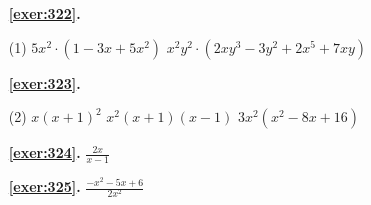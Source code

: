 \begin{enumerate}

 \item[\fontfamily{phv}\selectfont\color{blue}\textbf{\ref{exer:322}. }] \label{ans:322}
 \begin{tasks}[column-sep=1em, item-indent=1.3333em](1)
	 \task $5x^2 \cdot (1-3x+5x^2)$
	 \task* $x^2 y^2 \cdot (2 xy^3 - 3y^2 + 2 x^5 + 7xy)$
\end{tasks}



 \item[\fontfamily{phv}\selectfont\color{blue}\textbf{\ref{exer:323}. }] \label{ans:323}
 \begin{tasks}[column-sep=1em, item-indent=1.3333em](2)
	 \task $x (x+1)^2$
	 \task $x^2 (x+1)(x-1)$
	 \task $3x^2 (x^2-8x+16)$
\end{tasks}
\item[\fontfamily{phv}\selectfont\color{blue}\textbf{\ref{exer:324}. }] \label{ans:324} 
$\frac {2x}{x-1}$
\item[\fontfamily{phv}\selectfont\color{blue}\textbf{\ref{exer:325}. }] \label{ans:325} 
$\frac {-x^2-5x+6}{2x^2}$
 \end{enumerate}

 \vspace{1cm} 
 

\vspace{0.3cm}


